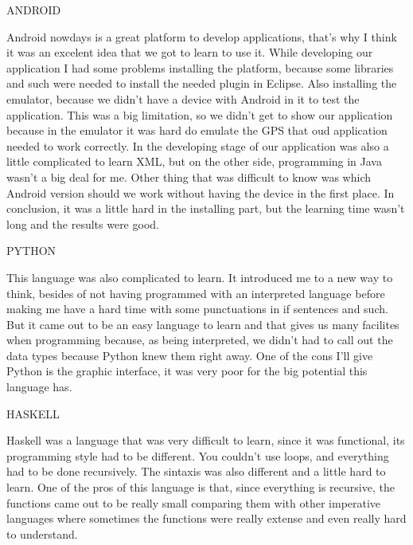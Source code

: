 ANDROID

Android nowdays is a great platform to develop applications, that's why I think it was an excelent idea that we got to learn to use it. While developing our application I had some problems installing the platform, because some libraries and such were needed to install the needed plugin in Eclipse. Also installing the emulator, because we didn't have a device with Android in it to test the application. This was a big limitation, so we didn't get to show our application because in the emulator it was hard do emulate the GPS that oud application needed to work correctly. In the developing stage of our application was also a little complicated to learn XML, but on the other side, programming in Java wasn't a big deal for me. Other thing that was difficult to know was which Android version should we work without having the device in the first place. In conclusion, it was a little hard in the installing part, but the learning time wasn't long and the results were good.


PYTHON

This language was also complicated to learn. It introduced me to a new way to think, besides of not having programmed with an interpreted language before making me have a hard time with some punctuations in if sentences and such. But it came out to be an easy language to learn and that gives us many facilites when programming because, as being interpreted, we didn't had to call out the data types because Python knew them right away. One of the cons I'll give Python is the graphic interface, it was very poor for the big potential this language has.


HASKELL

Haskell was a language that was very difficult to learn, since it was functional, its programming style had to be different. You couldn't use loops, and everything had to be done recursively. The sintaxis was also different and a little hard to learn. One of the pros of this language is that, since everything is recursive, the functions came out to be really small comparing them with other imperative languages where sometimes the functions were really extense and even really hard to understand.
